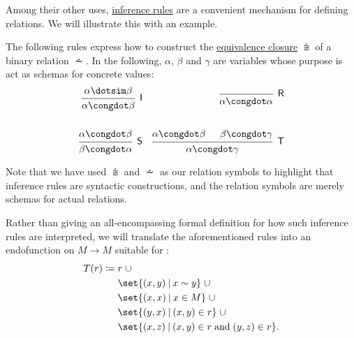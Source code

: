 \begin{example}\label{ex:fixed_point_recursion_for_relations}
  Among their other uses, \hyperref[def:inference_rule]{inference rules} are a convenient mechanism for defining relations. We will illustrate this with an example.

  The following rules express how to construct the \hyperref[thm:equivalence_closure]{equivalence closure} \( {\congdot} \) of a binary relation \( {\dotsim} \). In the following, \( \alpha \), \( \beta \) and \( \gamma \) are variables whose purpose is act as schemas for concrete values:
  \begin{align*}
    \begin{prooftree}
      \hypo{ \alpha \dotsim \beta }
      \infer1[\logic{I}]{ \alpha \congdot \beta }
    \end{prooftree}
    &&
    \begin{prooftree}
      \infer0[\logic{R}]{ \alpha \congdot \alpha }
    \end{prooftree}
    \\\\
    \begin{prooftree}
      \hypo{ \alpha \congdot \beta }
      \infer1[\logic{S}]{ \beta \congdot \alpha }
    \end{prooftree}
    &&
    \begin{prooftree}
      \hypo{ \alpha \congdot \beta }
      \hypo{ \beta \congdot \gamma }
      \infer2[\logic{T}]{ \alpha \congdot \gamma }
    \end{prooftree}
  \end{align*}

  Note that we have used \( {\congdot} \) and \( {\dotsim} \) as our relation symbols to highlight that inference rules are syntactic constructions, and the relation symbols are merely schemas for actual relations.

  Rather than giving an all-encompassing formal definition for how such inference rules are interpreted, we will translate the aforementioned rules into an endofunction on \( M \to M \) suitable for :
  \begin{equation*}
    \begin{aligned}
      T(r) \coloneqq \thickspace & r \thickspace {\cup} \\
                                 & \set{ (x, y) \given x \sim y } \thickspace {\cup} \\
                                 & \set{ (x, x) \given x \in M } \thickspace {\cup} \\
                                 & \set{ (y, x) \given (x, y) \in r } \thickspace {\cup} \\
                                 & \set{ (x, z) \given (x, y) \in r \T{and} (y, z) \in r }.
    \end{aligned}
  \end{equation*}


\end{example}
